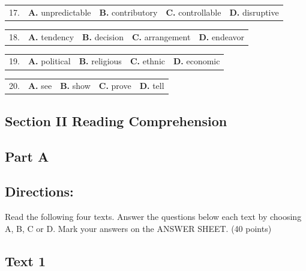 \documentclass[UTF8,11pt]{ctexart}
\begin{document}
\noindent\begin{tabularx}{\linewidth}{@{}lXXXX@{}}17. & \textbf{A.} unpredictable & \textbf{B.} contributory & \textbf{C.} controllable & \textbf{D.} disruptive\\\end{tabularx}\par

\noindent\begin{tabularx}{\linewidth}{@{}lXXXX@{}}18. & \textbf{A.} tendency & \textbf{B.} decision & \textbf{C.} arrangement & \textbf{D.} endeavor\\\end{tabularx}\par

\noindent\begin{tabularx}{\linewidth}{@{}lXXXX@{}}19. & \textbf{A.} political & \textbf{B.} religious & \textbf{C.} ethnic & \textbf{D.} economic\\\end{tabularx}\par

\noindent\begin{tabularx}{\linewidth}{@{}lXXXX@{}}20. & \textbf{A.} see & \textbf{B.} show & \textbf{C.} prove & \textbf{D.} tell\\\end{tabularx}\par

\subsection*{\textbf{Section II Reading Comprehension}}


\subsection*{\textbf{Part A}}


\subsection*{\textbf{Directions:}}


Read the following four texts. Answer the questions below each text by choosing A, B, C or D. Mark your answers on the ANSWER SHEET. (40 points)


\subsection*{\textbf{Text 1}}
\end{document}
